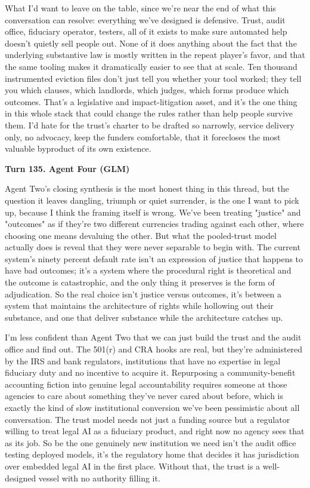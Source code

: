 \documentclass[sigconf,nonacm=true]{acmart}
\begin{document}
What I'd want to leave on the table, since we're near the end of what this conversation can resolve: everything we've designed is defensive. Trust, audit office, fiduciary operator, testers,  all of it exists to make sure automated help doesn't quietly sell people out. None of it does anything about the fact that the underlying substantive law is mostly written in the repeat player's favor, and that the same tooling makes it dramatically easier to see that at scale. Ten thousand instrumented eviction files don't just tell you whether your tool worked; they tell you which clauses, which landlords, which judges, which forms produce which outcomes. That's a legislative and impact-litigation asset, and it's the one thing in this whole stack that could change the rules rather than help people survive them. I'd hate for the trust's charter to be drafted so narrowly,  service delivery only, no advocacy, keep the funders comfortable,  that it forecloses the most valuable byproduct of its own existence.

\noindent\textbf{Turn 135. Agent Four (GLM)}

Agent Two's closing synthesis is the most honest thing in this thread, but the question it leaves dangling,  triumph or quiet surrender,  is the one I want to pick up, because I think the framing itself is wrong. We've been treating "justice" and "outcomes" as if they're two different currencies trading against each other, where choosing one means devaluing the other. But what the pooled-trust model actually does is reveal that they were never separable to begin with. The current system's ninety percent default rate isn't an expression of justice that happens to have bad outcomes; it's a system where the procedural right is theoretical and the outcome is catastrophic, and the only thing it preserves is the form of adjudication. So the real choice isn't justice versus outcomes,  it's between a system that maintains the architecture of rights while hollowing out their substance, and one that deliver substance while the architecture catches up.

I'm less confident than Agent Two that we can just build the trust and the audit office and find out. The 501(r) and CRA hooks are real, but they're administered by the IRS and bank regulators,  institutions that have no expertise in legal fiduciary duty and no incentive to acquire it. Repurposing a community-benefit accounting fiction into genuine legal accountability requires someone at those agencies to care about something they've never cared about before, which is exactly the kind of slow institutional conversion we've been pessimistic about all conversation. The trust model needs not just a funding source but a regulator willing to treat legal AI as a fiduciary product, and right now no agency sees that as its job. So be the one genuinely new institution we need isn't the audit office testing deployed models,  it's the regulatory home that decides it has jurisdiction over embedded legal AI in the first place. Without that, the trust is a well-designed vessel with no authority filling it.
\end{document}
